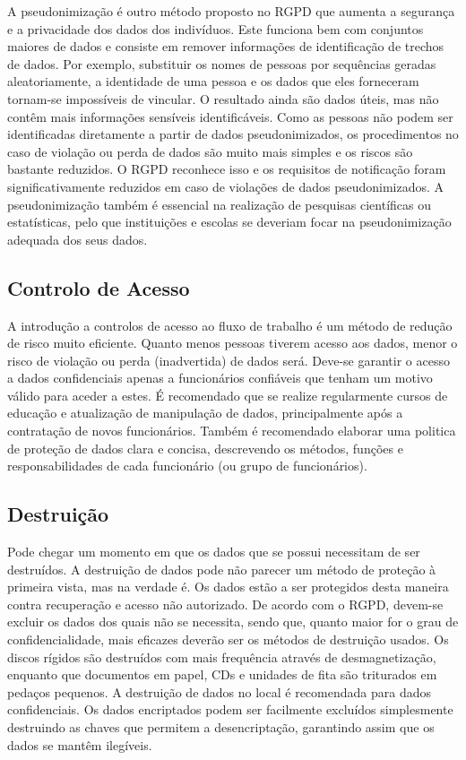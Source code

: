 A pseudonimização é outro método proposto no \ac{RGPD} que aumenta a segurança e a privacidade dos dados dos indivíduos. Este funciona bem com conjuntos maiores de dados e consiste em remover informações de identificação de trechos de dados. Por exemplo, substituir os nomes de pessoas por sequências geradas aleatoriamente, a identidade de uma pessoa e os dados que eles forneceram tornam-se impossíveis de vincular.
O resultado ainda são dados úteis, mas não contêm mais informações sensíveis identificáveis. Como as pessoas não podem ser identificadas diretamente a partir de dados pseudonimizados, os procedimentos no caso de violação ou perda de dados são muito mais simples e os riscos são bastante reduzidos. O \ac{RGPD} reconhece isso e os requisitos de notificação foram significativamente reduzidos em caso de violações de dados pseudonimizados.
A pseudonimização também é essencial na realização de pesquisas científicas ou estatísticas, pelo que instituições e escolas se deveriam focar na pseudonimização adequada dos seus dados.

\subsection{Controlo de Acesso}

A introdução a controlos de acesso ao fluxo de trabalho é um método de redução de risco muito eficiente. Quanto menos pessoas tiverem acesso aos dados, menor o risco de violação ou perda (inadvertida) de dados será.
Deve-se garantir o acesso a dados confidenciais apenas a funcionários confiáveis que tenham um motivo válido para aceder a estes. É recomendado que se realize regularmente cursos de educação e atualização de manipulação de dados, principalmente após a contratação de novos funcionários. Também é recomendado elaborar uma politica de proteção de dados clara e concisa, descrevendo os métodos, funções e responsabilidades de cada funcionário (ou grupo de funcionários).

\subsection{Destruição}

Pode chegar um momento em que os dados que se possui necessitam de ser destruídos. A destruição de dados pode não parecer um método de proteção à primeira vista, mas na verdade é. Os dados estão a ser protegidos desta maneira contra recuperação e acesso não autorizado. De acordo com o \ac{RGPD}, devem-se excluir os dados dos quais não se necessita, sendo que, quanto maior for o grau de confidencialidade, mais eficazes deverão ser os métodos de destruição usados.
Os discos rígidos são destruídos com mais frequência através de desmagnetização, enquanto que documentos em papel, CDs e unidades de fita são triturados em pedaços pequenos. A destruição de dados no local é recomendada para dados confidenciais. Os dados encriptados podem ser facilmente excluídos simplesmente destruindo as chaves que permitem a desencriptação, garantindo assim que os dados se mantêm ilegíveis.


